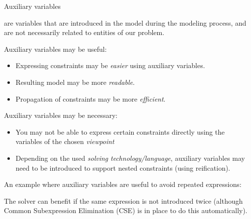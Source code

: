 \documentclass{cons-beamer}
\begin{document}
\begin{frame}{Auxiliary variables}
  \begin{definition}
     are variables that are introduced in the model during the modeling process, and are not necessarily related to entities of our problem.
  \end{definition}
  \vfill
  Auxiliary variables may be useful:
  \begin{itemize}
    \item Expressing constraints may be \textit{easier} using
      auxiliary variables.
    \item Resulting model may be more \textit{readable}.
    \item Propagation of constraints may be more \textit{efficient}.
  \end{itemize}

  \vfill

  Auxiliary variables may be necessary:
  \begin{itemize}
    \item You may not be able to express certain constraints directly using the variables of the chosen \textit{viewpoint}
    \item Depending on the used \textit{solving technology/language}, auxiliary variables may need to be introduced to support nested constraints (using reification).
  \end{itemize}
\end{frame}

\begin{frame}

  

  An example where auxiliary variables are useful to avoid repeated expressions:
  \pause
  

  The solver can benefit if the same expression is not introduced twice (although Common Subexpression Elimination (CSE) is in place to do this automatically).
\end{frame}
\end{document}
